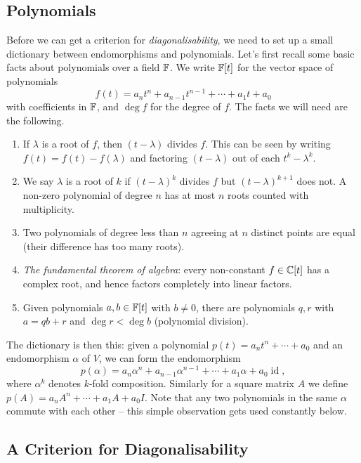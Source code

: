 \documentclass[a4paper]{scrartcl}
\begin{document}
\subsection{Polynomials}

Before we can get a criterion for \emph{diagonalisability}, we need to set up a small dictionary between endomorphisms and polynomials. Let's first recall some basic facts about polynomials over a field $\mathbb{F}$. We write $\mathbb{F}[t]$ for the vector space of polynomials
$$
f(t) = a_n t^n + a_{n - 1}t^{n - 1} + \cdots + a_1 t + a_0
$$
with coefficients in $\mathbb{F}$, and $\deg f$ for the degree of $f$. The facts we will need are the following.
\begin{enumerate}[label=(\roman*)]
    \item If $\lambda$ is a root of $f$, then $(t - \lambda)$ divides $f$. This can be seen by writing $f(t) = f(t) - f(\lambda)$ and factoring $(t - \lambda)$ out of each $t^k - \lambda^k$.
    \item We say $\lambda$ is a root of  $k$ if $(t - \lambda)^k$ divides $f$ but $(t - \lambda)^{k + 1}$ does not. A non-zero polynomial of degree $n$ has at most $n$ roots counted with multiplicity.
    \item Two polynomials of degree less than $n$ agreeing at $n$ distinct points are equal (their difference has too many roots).
    \item \emph{The fundamental theorem of algebra}: every non-constant $f \in \mathbb{C}[t]$ has a complex root, and hence factors completely into linear factors.
    \item Given polynomials $a, b \in \mathbb{F}[t]$ with $b \neq 0$, there are polynomials $q, r$ with $a = qb + r$ and $\deg r < \deg b$ (polynomial division).
\end{enumerate}

The dictionary is then this: given a polynomial $p(t) = a_n t^n + \cdots + a_0$ and an endomorphism $\alpha$ of $V$, we can form the endomorphism
$$
p(\alpha) = a_n \alpha^n + a_{n-1}\alpha^{n - 1} + \cdots + a_1 \alpha + a_0 \operatorname{id},
$$
where $\alpha^k$ denotes $k$-fold composition. Similarly for a square matrix $A$ we define $p(A) = a_n A^n + \cdots + a_1 A + a_0 I$. Note that any two polynomials in the same $\alpha$ commute with each other -- this simple observation gets used constantly below.

\subsection{A Criterion for Diagonalisability}
\end{document}
